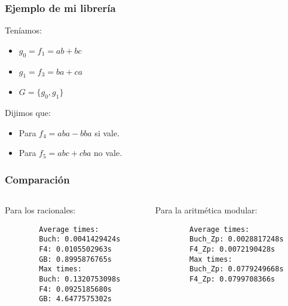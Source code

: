 \documentclass[spanish, aspectratio=169, hidecontrols]{beamer}
\begin{document}
\begin{frame}
  \frametitle{Ejemplo de mi librería}
  \begin{exampleblock}{}
    Teníamos:
    \begin{itemize}
      \item $g_0 = f_1 = ab + bc$
      \item $g_1 = f_3 = ba + ca$
      \item $G = \{g_0, g_1\}$
    \end{itemize}

    Dijimos que:
    \begin{itemize}
      \item Para $f_4 = aba - bba$ si vale.
      \item Para $f_5 = abc + cba$ no vale.
    \end{itemize}
  \end{exampleblock}
\end{frame}

\begin{frame}[fragile]
  \frametitle{Comparación}
  \begin{columns}
    \begin{column}{0.5\textwidth}
      Para los racionales:
      \begin{verbatim}
        Average times:
        Buch: 0.0041429424s
        F4: 0.0105502963s
        GB: 0.8995876765s
        Max times:
        Buch: 0.1320753098s
        F4: 0.0925185680s
        GB: 4.6477575302s
      \end{verbatim}
    \end{column}
    \begin{column}{0.5\textwidth}
      Para la aritmética modular:
      \begin{verbatim}
        Average times:
        Buch_Zp: 0.0028817248s
        F4_Zp: 0.0072190428s
        Max times:
        Buch_Zp: 0.0779249668s
        F4_Zp: 0.0799708366s
      \end{verbatim}
    \end{column}
  \end{columns}
\end{frame}
\end{document}

